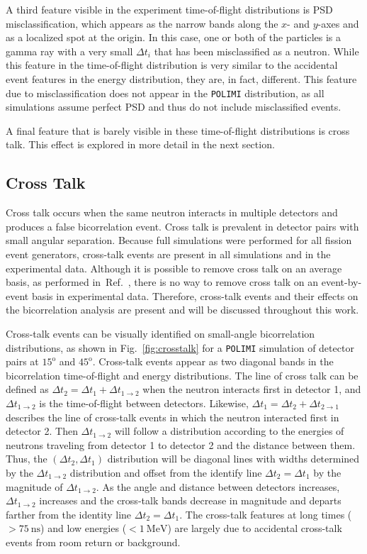 \documentclass[preprint,12pt]{elsarticle}
\newcommand{\fig}[1]     {Fig.~\ref{#1}}
\newcommand{\refref}[1]  {Ref.~\cite{#1}}
\newcommand{\polimi}          {\texttt{POLIMI}\xspace}
\newcommand{\Dti}{\ensuremath{\Delta t_i}\xspace}
\newcommand{\Dto}{\ensuremath{\Delta t_1}\xspace}
\newcommand{\Dtt}{\ensuremath{\Delta t_2}\xspace}
\newcommand{\Dtot}{\ensuremath{\Delta t_{1\rightarrow2}}\xspace}
\newcommand{\Dtto}{\ensuremath{\Delta t_{2\rightarrow1}}\xspace}
\newcommand{\genunit}[2]{\ensuremath{#1~\text{#2}}\xspace}
\newcommand{\MeV}[1]    {\genunit{#1}{MeV}}
\newcommand{\ns}[1]{\genunit{#1}{ns}}
\newcommand{\degrees}[1]{\ensuremath{#1^{\mathrm{o}}}\xspace}
\begin{document}
A third feature visible in the experiment time-of-flight distributions is PSD misclassification, which appears as the narrow bands along the $x$- and $y$-axes and as a localized spot at the origin. In this case, one or both of the particles is a gamma ray with a very small \Dti that has been misclassified as a neutron. While this feature in the time-of-flight distribution is very similar to the accidental event features in the energy distribution, they are, in fact, different. This feature due to misclassification does not appear in the \polimi distribution, as all simulations assume perfect PSD and thus do not include misclassified events. 

A final feature that is barely visible in these time-of-flight distributions is cross talk. This effect is explored in more detail in the next section. 

\subsection{Cross Talk}
Cross talk occurs when the same neutron interacts in multiple detectors and produces a false bicorrelation event. Cross talk is prevalent in detector pairs with small angular separation. Because full simulations were performed for all fission event generators, cross-talk events are present in all simulations and in the experimental data. %
Although it is possible to remove cross talk on an average basis, as performed in~\refref{Marcath2016}, there is no way to remove cross talk on an event-by-event basis in experimental data. Therefore, cross-talk events and their effects on the bicorrelation analysis are present and will be discussed throughout this work.

Cross-talk events can be visually identified on small-angle bicorrelation distributions, as shown in \fig{fig:crosstalk} for a \polimi simulation of detector pairs at \degrees{15} and \degrees{45}. Cross-talk events appear as two diagonal bands in the bicorrelation time-of-flight and energy distributions. The line of cross talk can be defined as $\Dtt = \Dto + \Dtot$ when the neutron interacts first in detector 1, and \Dtot is the time-of-flight between detectors. Likewise, $\Dto = \Dtt + \Dtto$ describes the line of cross-talk events in which the neutron interacted first in detector 2. Then \Dtot will follow a distribution according to the energies of neutrons traveling from detector 1 to detector 2 and the distance between them. Thus, the $(\Dtt,\Dto)$ distribution will be diagonal lines with widths determined by the \Dtot distribution and offset from the identify line $\Dtt = \Dto$ by the magnitude of \Dtot. As the angle and distance between detectors increases, \Dtot increases and the cross-talk bands decrease in magnitude and departs farther from the identity line $\Dtt = \Dto$. The cross-talk features at long times ($>\ns{75}$) and low energies ($<\MeV{1}$) are largely due to accidental cross-talk events from room return or background. 
\end{document}
